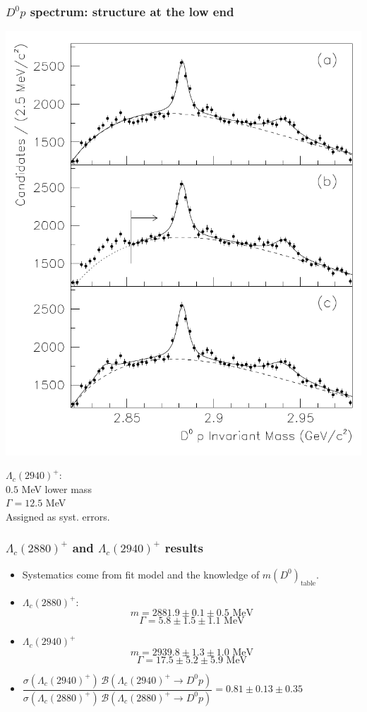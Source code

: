 \documentclass[10pt]{beamer}
\def\Lcb{{\Lambda_c(2940)^+}}
\def\LcIII{{\Lambda_c(2880)^+}}
\def\p{{p}}
\def\Dz{{D^0}}
\begin{document}
\begin{frame}[label=babar-Dp-alt]%
  \frametitle{$\Dz p$ spectrum: structure at the low end}
  \centering
  \parbox{.52\linewidth}{
    \includegraphics[height=.8\textheight]{figures/004/babar-fig002}
  } \parbox{.28\linewidth}{
    $\Lcb$: \\
    $0.5$ MeV lower mass \\
    $\Gamma = 12.5$ MeV \\

    \flushleft
    Assigned as syst. errors.
  }
\end{frame}%

\begin{frame}[label=babar-results]%
  \frametitle{$\LcIII$ and $\Lcb$ results}
  \large
  \begin{itemize}
    \item Systematics come from fit model
      and the knowledge of $m(\Dz)_\text{table}$.
    \item $\LcIII$:
      $$m = 2881.9 \pm 0.1 \pm 0.5 \text{ MeV}$$
      $$\Gamma = 5.8 \pm 1.5 \pm 1.1 \text{ MeV} $$
    \item $\Lcb$
      $$m = 2939.8 \pm 1.3 \pm 1.0 \text{ MeV} $$
      $$\Gamma = 17.5 \pm 5.2 \pm 5.9 \text{ MeV} $$
    \item $ \dfrac{\sigma\left(\Lcb\right)\,
      \mathcal{B}\left(\Lcb\to\Dz\p\right)}
      {\sigma\left(\LcIII\right)\,
      \mathcal{B}\left(\LcIII\to\Dz\p\right)}
      = 0.81 \pm 0.13 \pm 0.35
      $
  \end{itemize}
\end{frame}%
\end{document}
